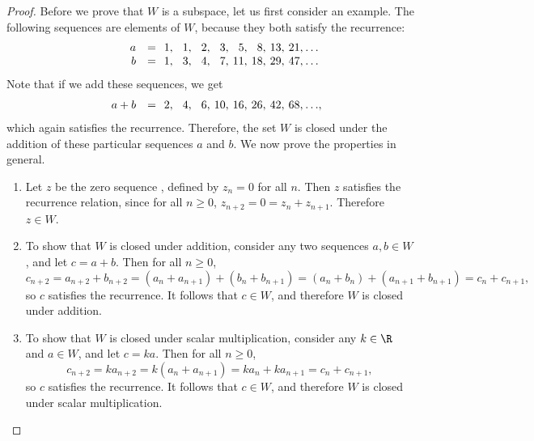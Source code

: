 \begin{proof}
  \def\x#1{\makebox[1.2em][r]{$#1$}}
  \def\y#1{\makebox[3em][r]{$#1$}}
  \def\z#1{\makebox[0em][l]{$#1$}}
  Before we prove that $W$ is a subspace, let us first consider an
  example. The following sequences are elements of $W$, because they
  both satisfy the recurrence:
  \begin{equation*}
    \begin{array}{rc@{}l}
      \y{a} &=& \x{1},\x{1},\x{2},\x{3},\x{5},\x{8},\x{13},\x{21},\x{\ldots} \\
      \y{b} &=& \x{1},\x{3},\x{4},\x{7},\x{11},\x{18},\x{29},\x{47},\x{\ldots}
    \end{array}
  \end{equation*}
  Note that if we add these sequences, we get
  \begin{equation*}
    \begin{array}{rc@{}l}
      \y{a+b} &=& \x{2},\x{4},\x{6},\x{10},\x{16},\x{26},\x{42},\x{68},\x{\ldots}\z{,} \\
    \end{array}
  \end{equation*}
  which again satisfies the recurrence. Therefore, the set $W$ is
  closed under the addition of these particular sequences $a$ and
  $b$. We now prove the properties in general.
  \begin{enumerate}
  \item Let $z$ be the zero sequence%
    , defined by $z_n=0$ for all $n$.
    Then $z$ satisfies the recurrence relation, since for all $n\geq 0$,
    $z_{n+2}=0=z_n+z_{n+1}$. Therefore $z\in W$.
  \item To show that $W$ is closed under addition, consider any two
    sequences $a,b\in W$, and let $c=a+b$. Then for all $n\geq 0$,
    \begin{equation*}
      c_{n+2}
      = a_{n+2} + b_{n+2}
      = (a_n + a_{n+1}) + (b_n + b_{n+1})
      = (a_n + b_n) + (a_{n+1} + b_{n+1})
      = c_n + c_{n+1},
    \end{equation*}
    so $c$ satisfies the recurrence. It follows that $c\in W$, and
    therefore $W$ is closed under addition.
  \item To show that $W$ is closed under scalar multiplication,
    consider any $k\in\R$ and $a\in W$, and let $c=ka$. Then for all
    $n\geq 0$,
    \begin{equation*}
      c_{n+2}
      = ka_{n+2}
      = k(a_n + a_{n+1})
      = ka_n + ka_{n+1}
      = c_n + c_{n+1},
    \end{equation*}
    so $c$ satisfies the recurrence. It follows that $c\in W$, and
    therefore $W$ is closed under scalar multiplication.
  \end{enumerate}
\end{proof}


